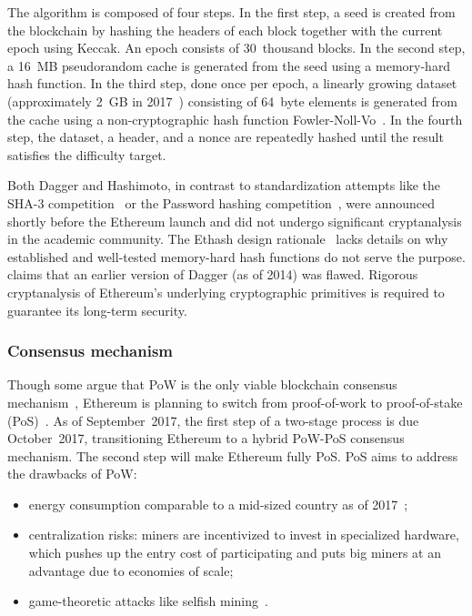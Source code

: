 The algorithm is composed of four steps.
In the first step, a seed is created from the blockchain by hashing the headers of each block together with the current epoch using Keccak.
An epoch consists of 30~thousand blocks.
In the second step, a 16~MB pseudorandom cache is generated from the seed using a memory-hard hash function.
In the third step, done once per epoch, a linearly growing dataset (approximately 2~GB in 2017~\cite{DAGsize}) consisting of 64~byte elements is generated from the cache using a non-cryptographic hash function Fowler-Noll-Vo~\cite{Noll2017}.
In the fourth step, the dataset, a header, and a nonce are repeatedly hashed until the result satisfies the difficulty target.

Both Dagger and Hashimoto, in contrast to standardization attempts like the SHA-3 competition~\cite{SHA3} or the Password hashing competition~\cite{PHC}, were announced shortly before the Ethereum launch and did not undergo significant cryptanalysis in the academic community.
The Ethash design rationale~\cite{Buterin2017} lacks details on why established and well-tested memory-hard hash functions do not serve the purpose.
\cite{Lerner2014} claims that an earlier version of Dagger (as of 2014) was flawed.
Rigorous cryptanalysis of Ethereum's underlying cryptographic primitives is required to guarantee its long-term security.


\subsubsection{Consensus mechanism} \label{Consensus}
Though some argue that PoW is the only viable blockchain consensus mechanism~\cite{Andreev2014, Sztorc2015}, Ethereum is planning to switch from proof-of-work to proof-of-stake (PoS)~\cite{Hertig2017}.
As of September~2017, the first step of a two-stage process is due October~2017, transitioning Ethereum to a hybrid PoW-PoS consensus mechanism.
The second step will make Ethereum fully PoS.
PoS aims to address the drawbacks of PoW:
\begin{itemize}
	\item energy consumption comparable to a mid-sized country as of 2017~\cite{Digiconomist17};
	\item centralization risks: miners are incentivized to invest in specialized hardware, which pushes up the entry cost of participating and puts big miners at an advantage due to economies of scale;
	\item game-theoretic attacks like selfish mining~\cite{Eyal2018}.
\end{itemize}

